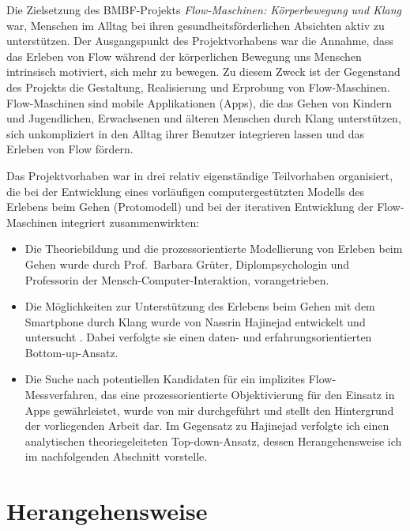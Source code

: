Die Zielsetzung des \acs{BMBF}-Projekts \emph{Flow-Maschinen: Körperbewegung und Klang} war, Menschen im Alltag bei ihren gesundheitsförderlichen Absichten aktiv zu unterstützen. Der Ausgangspunkt des Projektvorhabens war die Annahme, dass das Erleben von Flow während der körperlichen Bewegung uns Menschen intrinsisch motiviert, sich mehr zu bewegen. Zu diesem Zweck ist der Gegenstand des Projekts die Gestaltung, Realisierung und Erprobung von Flow-Maschinen. Flow-Maschinen sind mobile Applikationen (Apps), die das Gehen von Kindern und Jugendlichen, Erwachsenen und älteren Menschen durch Klang unterstützen, sich unkompliziert in den Alltag ihrer Benutzer integrieren lassen und das Erleben von Flow fördern.

Das Projektvorhaben war in drei relativ eigenständige Teilvorhaben organisiert, die bei der Entwicklung eines vorläufigen computergestützten Modells des Erlebens beim Gehen (Protomodell) und bei der iterativen Entwicklung der Flow-Maschinen integriert zusammenwirkten: 
\begin{itemize}
	
	\item Die Theoriebildung und die prozessorientierte Modellierung von Erleben beim Gehen wurde durch Prof.\ Barbara Grüter, Diplompsychologin und Professorin der Mensch-Computer-Interaktion, vorangetrieben.
	
	\item Die Möglichkeiten zur Unterstützung des Erlebens beim Gehen mit dem Smartphone durch Klang wurde von Nassrin Hajinejad entwickelt und untersucht \citep{Hajinejad2013, Hajinejad2015}. Dabei verfolgte sie einen daten- und erfahrungsorientierten Bottom-up-Ansatz.
	
	\item Die Suche nach potentiellen Kandidaten für ein implizites Flow-Messverfahren, das eine prozessorientierte Objektivierung für den Einsatz in Apps gewährleistet, wurde von mir durchgeführt und stellt den Hintergrund der vorliegenden Arbeit dar. Im Gegensatz zu Hajinejad verfolgte ich einen analytischen theoriegeleiteten Top-down-Ansatz, dessen Herangehensweise ich im nachfolgenden Abschnitt vorstelle. 
\end{itemize}

\section{Herangehensweise} 

\label{sec:herangehensweise}

